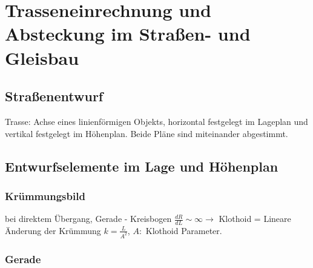 \documentclass[12pt]{article}
\begin{document}
	\pagestyle{main}
\tableofcontents
\newpage
\section{Trasseneinrechnung und Absteckung im Straßen- und Gleisbau}	
\subsection{Straßenentwurf}
Trasse: Achse eines linienförmigen Objekts, horizontal festgelegt im Lageplan und vertikal festgelegt im Höhenplan. Beide Pläne sind miteinander abgestimmt.
\subsection{Entwurfselemente im Lage und Höhenplan}
\subsubsection{Krümmungsbild}
bei direktem Übergang, Gerade - Kreisbogen $\frac{dR}{dL} \sim \infty \longrightarrow$ Klothoid = Lineare Änderung der Krümmung $k = \frac{L}{A^2}$, $A:$ Klothoid Parameter.
\subsubsection{Gerade}
\end{document}
